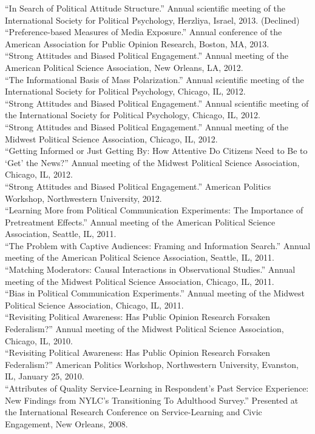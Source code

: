 \documentclass[12pt]{article}
\newcommand{\entry}[1]{\indent {\color{lg}\guillemotright}\hspace{2pt}#1\vspace{.25em}\\}
\begin{document}
\entry{``In Search of Political Attitude Structure.'' Annual scientific meeting of the International Society for Political Psychology, Herzliya, Israel, 2013. (Declined)}
\entry{``Preference-based Measures of Media Exposure.'' Annual conference of the American Association for Public Opinion Research, Boston, MA, 2013.}
\entry{``Strong Attitudes and Biased Political Engagement.'' Annual meeting of the American Political Science Association, New Orleans, LA, 2012.}
\entry{``The Informational Basis of Mass Polarization.'' Annual scientific meeting of the International Society for Political Psychology, Chicago, IL, 2012.}
\entry{``Strong Attitudes and Biased Political Engagement.'' Annual scientific meeting of the International Society for Political Psychology, Chicago, IL, 2012.}
\entry{``Strong Attitudes and Biased Political Engagement.'' Annual meeting of the Midwest Political Science Association, Chicago, IL, 2012.}
\entry{``Getting Informed or Just Getting By: How Attentive Do Citizens Need to Be to `Get' the News?'' Annual meeting of the Midwest Political Science Association, Chicago, IL, 2012.}
\entry{``Strong Attitudes and Biased Political Engagement.'' American Politics Workshop, Northwestern University, 2012.}
\entry{``Learning More from Political Communication Experiments: The Importance of Pretreatment Effects.'' Annual meeting of the American Political Science Association, Seattle, IL, 2011.}
\entry{``The Problem with Captive Audiences: Framing and Information Search.'' Annual meeting of the American Political Science Association, Seattle, IL, 2011.}
\entry{``Matching Moderators: Causal Interactions in Observational Studies.'' Annual meeting of the Midwest Political Science Association, Chicago, IL, 2011.}
\entry{``Bias in Political Communication Experiments.'' Annual meeting of the Midwest Political Science Association, Chicago, IL, 2011.}
\entry{``Revisiting Political Awareness: Has Public Opinion Research Forsaken Federalism?'' Annual meeting of the Midwest Political Science Association, Chicago, IL, 2010.}
\entry{``Revisiting Political Awareness: Has Public Opinion Research Forsaken Federalism?'' American Politics Workshop, Northwestern University, Evanston, IL, January 25, 2010.}
\entry{``Attributes of Quality Service-Learning in Respondent's Past Service Experience: New Findings from NYLC's Transitioning To Adulthood Survey.'' Presented at the International Research Conference on Service-Learning and Civic Engagement, New Orleans, 2008.}
\end{document}
